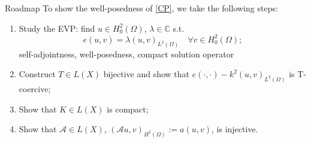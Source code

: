 \documentclass[11pt,aspectratio=169,xcolor=dvipsnames]{beamer}
\newcommand{\nicearrow}[2]{\raisebox{#2}{\resizebox{0.45cm}{!}{\color{#1}{\MVRightArrow}\color{black}}}}
\begin{document}
\begin{frame}{Roadmap}
  To show the well-posedness of \eqref{CP}, we take the following steps: 
  \begin{enumerate}
    \item<1-> Study the EVP: find $u \in H^2_0(\Omega)$, $\lambda \in \mathbb{C}$ s.t. 
    \begin{equation*}
      e(u,v) = \lambda (u,v)_{L^2(\Omega)} \quad \forall v \in H^2_0(\Omega);
    \end{equation*}
    \nicearrow{GOE}{-0.07cm} self-adjointness, well-posedness, compact solution operator
    \item<2-> Construct $T \in L(X)$ bijective and show that $e(\cdot,\cdot) - k^2(u,v)_{L^2(\Omega)}$ is T-coercive;
    \item<3-> Show that $K \in L(X)$ is compact;
    \item<4-> Show that $\mathcal{A} \in L(X)$, $(\mathcal{A}u,v)_{H^2(\Omega)} := a(u,v)$, is injective.
  \end{enumerate}
  \begin{center}
  \end{center}
  \vspace*{-0.25cm}
\end{frame}
\end{document}
